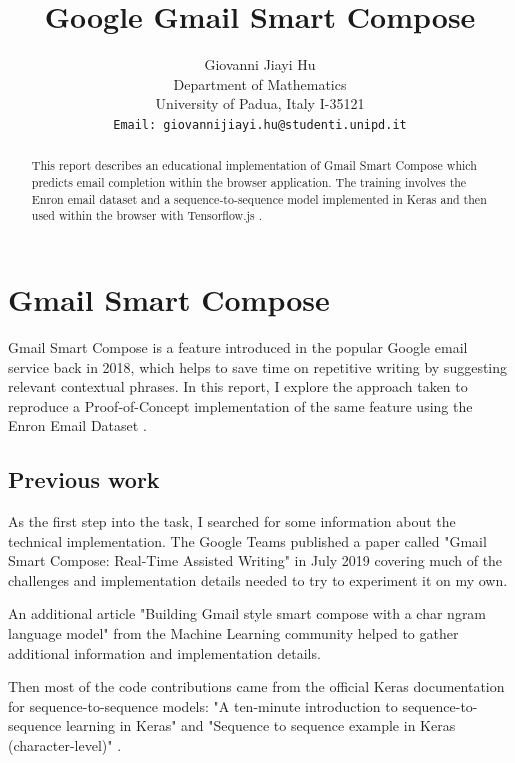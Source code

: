 \documentclass{article}
\title{Google Gmail Smart Compose}
\author{
  Giovanni Jiayi Hu\\
  Department of Mathematics\\
  University of Padua, Italy I-35121\\
  \texttt{Email: giovannijiayi.hu@studenti.unipd.it} \\
}
\begin{document}
\maketitle

\begin{abstract}
This report describes an educational implementation of Gmail Smart Compose which predicts email completion within the browser application. The training involves the Enron email dataset and a sequence-to-sequence model implemented in Keras and then used within the browser with Tensorflow.js .
\end{abstract}



\section{Gmail Smart Compose}\label{gmail-smart-compose}

Gmail Smart Compose \cite{gmail-smart-compose} is a feature introduced in the popular Google email service back in 2018, which helps to save time on repetitive writing by suggesting relevant contextual phrases. In this report, I explore the approach taken to reproduce a Proof-of-Concept implementation of the same feature using the Enron Email Dataset \cite{kaggle}.

\subsection{Previous work}\label{previous-work}

As the first step into the task, I searched for some information about the technical implementation. The Google Teams published a paper called "Gmail Smart Compose: Real-Time Assisted Writing" \cite{paper} in July 2019 covering much of the challenges and implementation details needed to try to experiment it on my own.

An additional article "Building Gmail style smart compose with a char ngram language model" \cite{building-gmail} from the Machine Learning community helped to gather additional information and implementation details.

Then most of the code contributions came from the official Keras documentation for sequence-to-sequence models: "A ten-minute introduction to sequence-to-sequence learning in Keras" \cite{ten-minutes} and "Sequence to sequence example in Keras (character-level)" \cite{seq2seq-keras}.
\end{document}
